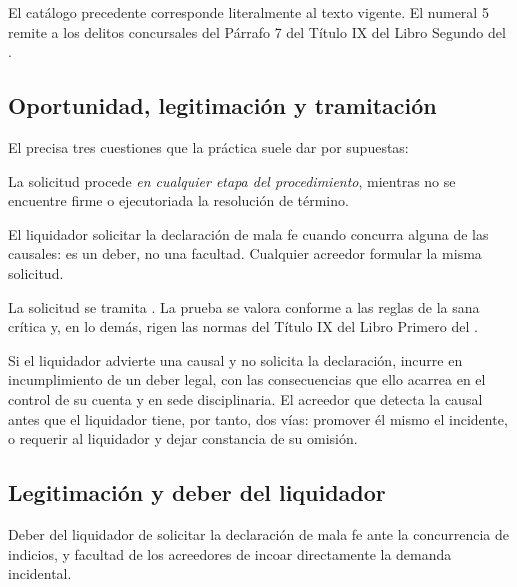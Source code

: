 El catálogo precedente corresponde literalmente al texto vigente. El numeral 5 remite a
los delitos concursales del Párrafo 7 del Título IX del Libro Segundo del \cpen{}.

\subsection{Oportunidad, legitimación y tramitación}

El  precisa tres cuestiones que la práctica suele dar por supuestas:

\begin{description}[leftmargin=0pt,style=nextline,font=\sffamily\bfseries]
  \item[Oportunidad] La solicitud procede \emph{en cualquier etapa del procedimiento},
  mientras no se encuentre firme o ejecutoriada la resolución de término.

  \item[Legitimación asimétrica] El liquidador  solicitar la
  declaración de mala fe cuando concurra alguna de las causales: es un deber, no una
  facultad. Cualquier acreedor  formular la misma solicitud.

  \item[Tramitación] La solicitud se tramita . La prueba se valora conforme a las reglas de la sana crítica y, en lo demás,
  rigen las normas del Título IX del Libro Primero del \cpc{}.
\end{description}

\begin{foco}
Si el liquidador advierte una causal y no solicita la declaración, incurre en
incumplimiento de un deber legal, con las consecuencias que ello acarrea en el control de
su cuenta y en sede disciplinaria. El acreedor que detecta la causal antes que el
liquidador tiene, por tanto, dos vías: promover él mismo el incidente, o requerir al
liquidador y dejar constancia de su omisión.
\end{foco}

\subsection{Legitimación y deber del liquidador}

Deber del liquidador de solicitar la declaración de mala fe ante la concurrencia de
indicios, y facultad de los acreedores de incoar directamente la demanda incidental.

